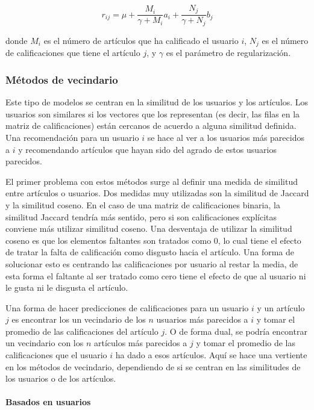 \[
r_{ij} = \mu + \frac{M_i}{\gamma + M_i} a_i + \frac{N_j}{\gamma + N_j}b_j
\]

donde $M_i$ es el número de artículos que ha calificado el usuario $i$, $N_j$ es el número de calificaciones que tiene el artículo $j$, y $\gamma$ es el parámetro de regularización.

\subsubsection{Métodos de vecindario}

Este tipo de modelos se centran en la similitud de los usuarios y los artículos. Los usuarios son similares si los vectores que los representan (es decir, las filas en la matriz de calificaciones) están cercanos de acuerdo a alguna similitud definida. Una recomendación para un usuario $i$ se hace al ver a los usuarios más parecidos a $i$ y recomendando artículos que hayan sido del agrado de estos usuarios parecidos.

El primer problema con estos métodos surge al definir una medida de similitud entre artículos o usuarios. Dos medidas muy utilizadas son la similitud de Jaccard y la similitud coseno. En el caso de una matriz de calificaciones binaria, la similitud Jaccard tendría más sentido, pero si son calificaciones explícitas conviene más utilizar similitud coseno. Una desventaja de utilizar la similitud coseno es que los elementos faltantes son tratados como $0$, lo cual tiene el efecto de tratar la falta de calificación como disgusto hacia el artículo. Una forma de solucionar esto es centrando las calificaciones por usuario al restar la media, de esta forma el faltante al ser tratado como cero tiene el efecto de que al usuario ni le gusta ni le disgusta el artículo.

Una forma de hacer predicciones de calificaciones para un usuario $i$ y un artículo $j$ es encontrar los un vecindario de los $n$ usuarios más parecidos a $i$ y tomar el promedio de las calificaciones del artículo $j$. O de forma dual, se podría encontrar un vecindario con los $n$ artículos más parecidos a $j$ y tomar el promedio de las calificaciones que el usuario $i$ ha dado a esos artículos. Aquí se hace una vertiente en los métodos de vecindario, dependiendo de si se centran en las similitudes de los usuarios o de los artículos.

\paragraph{Basados en usuarios}

